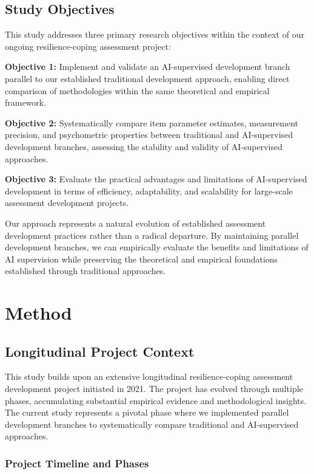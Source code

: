 \documentclass[12pt,a4paper]{article}
\begin{document}
\subsection{Study Objectives}

This study addresses three primary research objectives within the context of our ongoing resilience-coping assessment project:

\textbf{Objective 1:} Implement and validate an AI-supervised development branch parallel to our established traditional development approach, enabling direct comparison of methodologies within the same theoretical and empirical framework.

\textbf{Objective 2:} Systematically compare item parameter estimates, measurement precision, and psychometric properties between traditional and AI-supervised development branches, assessing the stability and validity of AI-supervised approaches.

\textbf{Objective 3:} Evaluate the practical advantages and limitations of AI-supervised development in terms of efficiency, adaptability, and scalability for large-scale assessment development projects.

Our approach represents a natural evolution of established assessment development practices rather than a radical departure. By maintaining parallel development branches, we can empirically evaluate the benefits and limitations of AI supervision while preserving the theoretical and empirical foundations established through traditional approaches.

\section{Method}

\subsection{Longitudinal Project Context}

This study builds upon an extensive longitudinal resilience-coping assessment development project initiated in 2021. The project has evolved through multiple phases, accumulating substantial empirical evidence and methodological insights. The current study represents a pivotal phase where we implemented parallel development branches to systematically compare traditional and AI-supervised approaches.

\subsubsection{Project Timeline and Phases}
\end{document}
